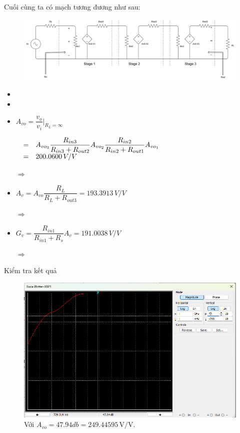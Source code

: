 \noindent Cuối cùng ta có mạch tương đương như sau:

\begin{figure}[H]
	\centering
	\includegraphics[width=.9\linewidth]{./my-chapters/my-diagrams/Question6/caub_1.png}
\end{figure}

\begin{itemize}[label =-]
	\item {}
	\item {}
	\item $A_{vo} = \dfrac{v_{o}}{v_{i}}|_{R_{L} = \infty}$
	
	$\begin{matrix}
			   & = & A_{vo_{3}} \dfrac{R_{in3}}{R_{in3} + R_{out2}} A_{vo_{2}} \dfrac{R_{in2}}{R_{in2} + R_{out1}}A_{vo_{1}} \hfill\\
			   & = & 200.0600 \, V/V \hfill
	\end{matrix}$
	
	$\Rightarrow$ 

	\item $A_{v} = A_{vo} \dfrac{R_{L}}{R_{L} + R_{out3}} = 193.3913\, V/V$
	
	$\Rightarrow$ 
	\item $G_{v} = \dfrac{R_{in1}}{R_{in1} + R_{s}} A_{v} = 191.0038\, V/V$
	
	$\Rightarrow$ 
\end{itemize}

Kiểm tra kết quả

\begin{figure}[H]
	\centering
	\includegraphics[width=.8\linewidth]{./my-chapters/my-images/Question6/b_bode_A_vo.png}
	\caption{Với $A_{vo} = 47.94db = 249.44595\,\text{V/V}$.}
\end{figure}

